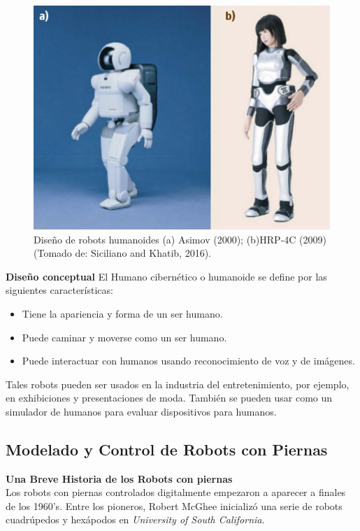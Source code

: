 \documentclass{book}
\begin{document}
\begin{figure}
	\centering		
	\includegraphics[scale=0.5]{images/asimov_and_HRP-4C.png}
	\caption{Diseño de robots humanoides (a) Asimov (2000); (b)HRP-4C (2009) (Tomado de: Siciliano and Khatib, 2016).}		
\end{figure}


		\textbf{Diseño conceptual}
El Humano cibernético o humanoide se define por las siguientes características:
\begin{itemize}
\item Tiene la apariencia y forma de un ser humano.
\item Puede caminar y moverse como un ser humano.
\item Puede interactuar con humanos usando reconocimiento de voz y de imágenes.
\end{itemize}
Tales robots pueden ser usados en la industria del entretenimiento, por ejemplo, en exhibiciones y presentaciones de moda. También se pueden usar como un simulador de humanos para evaluar dispositivos para humanos.\\

\subsection{Modelado y Control de Robots con Piernas}
	\textbf{Una Breve Historia de los Robots con piernas}\\
		Los robots con piernas controlados digitalmente empezaron a aparecer a finales de los 1960's. Entre los pioneros, Robert McGhee inicializó una serie de robots cuadrúpedos y hexápodos en \textit{University of South California}.\\
\end{document}
